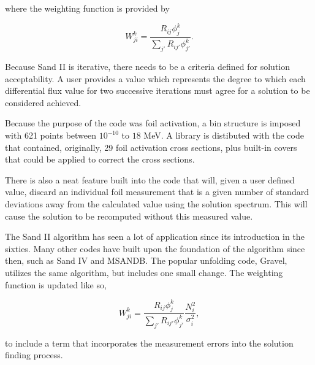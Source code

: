 where the weighting function is provided by

\begin{equation}\label{eqn:sandii-w}
W_{ji}^k = \frac{R_{ij} \phi_{j}^k}{\sum_{j'} R_{ij'} \phi_{j'}^k} .
\end{equation}

Because Sand II is iterative, there needs to be a criteria defined for solution acceptability.
A user provides a value which represents the degree to which each differential flux value for two successive iterations must agree for a solution to be considered achieved.

Because the purpose of the code was foil activation, a bin structure is imposed with 621 points between $10^{-10}$ to $18$ MeV.
A library is distibuted with the code that contained, originally, 29 foil activation cross sections, plus built-in covers that could be applied to correct the cross sections.

There is also a neat feature built into the code that will, given a user defined value, discard an individual foil measurement that is a given number of standard deviations away from the calculated value using the solution spectrum.
This will cause the solution to be recomputed without this measured value.

The Sand II algorithm has seen a lot of application since its introduction in the sixties.
Many other codes have built upon the foundation of the algorithm since then, such as Sand IV and MSANDB.
The popular unfolding code, Gravel, utilizes the same algorithm, but includes one small change.
The weighting function is updated like so,

\begin{equation}\label{eqn:gravel-w}
W_{ji}^k = \frac{R_{ij} \phi_{j}^k}{\sum_{j'} R_{ij'} \phi_{j'}^k} \frac{N_i^2}{\sigma_i^2} ,
\end{equation}

to include a term that incorporates the measurement errors into the solution finding process.



